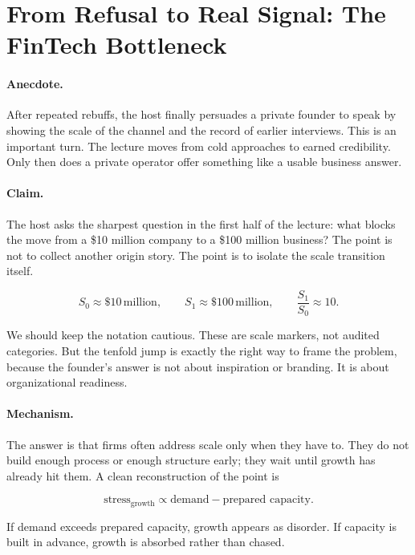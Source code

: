 \section{From Refusal to Real Signal: The FinTech Bottleneck}

\paragraph{Anecdote.} After repeated rebuffs, the host finally persuades a private founder to speak by showing the scale of the channel and the record of earlier interviews. This is an important turn. The lecture moves from cold approaches to earned credibility. Only then does a private operator offer something like a usable business answer.

\paragraph{Claim.} The host asks the sharpest question in the first half of the lecture: what blocks the move from a \$10 million company to a \$100 million business? The point is not to collect another origin story. The point is to isolate the scale transition itself.

\begin{equation}
S_0 \approx \$10\,\text{million},\qquad S_1 \approx \$100\,\text{million},\qquad \frac{S_1}{S_0} \approx 10.
\end{equation}

We should keep the notation cautious. These are scale markers, not audited categories. But the tenfold jump is exactly the right way to frame the problem, because the founder's answer is not about inspiration or branding. It is about organizational readiness.

\paragraph{Mechanism.} The answer is that firms often address scale only when they have to. They do not build enough process or enough structure early; they wait until growth has already hit them. A clean reconstruction of the point is

\begin{equation}
\text{stress}_{\text{growth}} \propto \text{demand} - \text{prepared capacity}.
\end{equation}

If demand exceeds prepared capacity, growth appears as disorder. If capacity is built in advance, growth is absorbed rather than chased.

